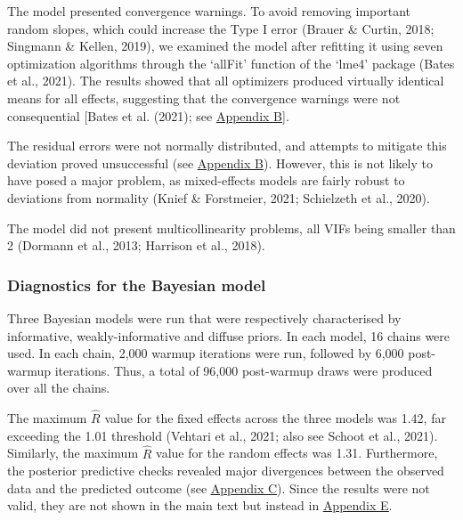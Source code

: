 \documentclass[
  12pt,
  man,floatsintext]{apa7}
\begin{document}
The model presented convergence warnings. To avoid removing important random slopes, which could increase the Type I error (Brauer \& Curtin, 2018; Singmann \& Kellen, 2019), we examined the model after refitting it using seven optimization algorithms through the `allFit' function of the `lme4' package (Bates et al., 2021). The results showed that all optimizers produced virtually identical means for all effects, suggesting that the convergence warnings were not consequential {[}Bates et al. (2021); see \protect\hyperlink{appendix-B-frequentist-analysis-diagnostics}{\underline{Appendix B}}{]}.

The residual errors were not normally distributed, and attempts to mitigate this deviation proved unsuccessful (see \protect\hyperlink{appendix-B-frequentist-analysis-diagnostics}{\underline{Appendix B}}). However, this is not likely to have posed a major problem, as mixed-effects models are fairly robust to deviations from normality (Knief \& Forstmeier, 2021; Schielzeth et al., 2020).

The model did not present multicollinearity problems, all VIFs being smaller than 2 (Dormann et al., 2013; Harrison et al., 2018).

\hypertarget{diagnostics-for-the-bayesian-model-1}{%
\subsubsection{Diagnostics for the Bayesian model}\label{diagnostics-for-the-bayesian-model-1}}

Three Bayesian models were run that were respectively characterised by informative, weakly-informative and diffuse priors. In each model, 16 chains were used. In each chain, 2,000 warmup iterations were run, followed by 6,000 post-warmup iterations. Thus, a total of 96,000 post-warmup draws were produced over all the chains.

The maximum \(\widehat R\) value for the fixed effects across the three models was 1.42, far exceeding the 1.01 threshold (Vehtari et al., 2021; also see Schoot et al., 2021). Similarly, the maximum \(\widehat R\) value for the random effects was 1.31. Furthermore, the posterior predictive checks revealed major divergences between the observed data and the predicted outcome (see \protect\hyperlink{appendix-C-Bayesian-analysis-diagnostics}{\underline{Appendix C}}). Since the results were not valid, they are not shown in the main text but instead in \protect\hyperlink{appendix-E-Bayesian-analysis-results}{\underline{Appendix E}}.
\end{document}
